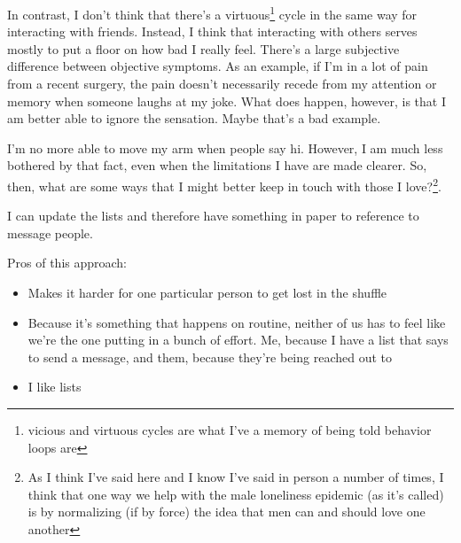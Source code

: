 \documentclass[12pt]{article}
\renewcommand{\,}{\textsuperscript{,}}
\begin{document}
In contrast, I don't think that there's a virtuous\footnote{vicious and virtuous cycles are what I've a memory of being told behavior loops are} cycle in the same way for interacting with friends.  
Instead, I think that interacting with others serves mostly to put a floor on how bad I really feel.  
There's a large subjective difference between objective symptoms.  
As an example, if I'm in a lot of pain from a recent surgery, the pain doesn't necessarily recede from my attention or memory when someone laughs at my joke.  
What does happen, however, is that I am better able to ignore the sensation.  
Maybe that's a bad example.

I'm no more able to move my arm when people say hi.  
However, I am much less bothered by that fact, even when the limitations I have are made clearer.  
So, then, what are some ways that I might better keep in touch with those I love?\footnote{As I think I've said here and I know I've said in person a number of times, I think that one way we help with the male loneliness epidemic (as it's called) is by normalizing (if by force) the idea that men can and should love one another}.

I can update the lists and therefore have something in paper to reference to message people.

Pros of this approach:  
\begin{itemize}  
\item Makes it harder for one particular person to get lost in the shuffle  
\item Because it's something that happens on routine, neither of us has to feel like we're the one putting in a bunch of effort. Me, because I have a list that says to send a message, and them, because they're being reached out to  
\item I like lists  
\end{itemize}
\end{document}
